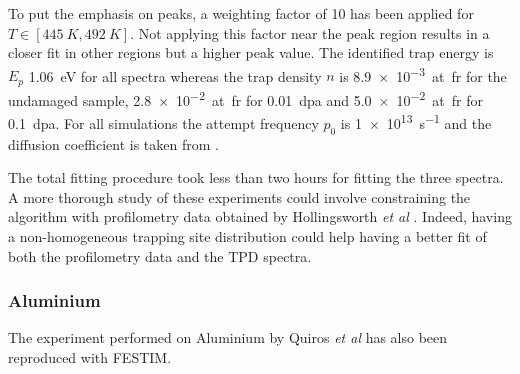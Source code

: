 To put the emphasis on peaks, a weighting factor of 10 has been applied for $T \in [\SI{445}{K}, \SI{492}{K}]$.
Not applying this factor near the peak region results in a closer fit in other regions but a higher peak value.
The identified trap energy is $E_p$ \SI{1.06}{eV} for all spectra whereas the trap density $n$ is \SI{8.9e-3}{at.fr} for the undamaged sample, \SI{2.8e-2}{at.fr} for \SI{0.01}{dpa} and \newline \SI{5.0e-2}{at.fr} for \SI{0.1}{dpa}.
For all simulations the attempt frequency $p_0$ is \SI{1e13}{s^{-1}} and the diffusion coefficient is taken from .

The total fitting procedure took less than two hours for fitting the three spectra.
A more thorough study of these experiments could involve constraining the algorithm with profilometry data obtained by Hollingsworth \textit{et al} \cite{hollingsworth_comparative_2019}.
Indeed, having a non-homogeneous trapping site distribution could help having a better fit of both the profilometry data and the TPD spectra. 

\subsubsection{Aluminium}

The experiment performed on Aluminium by Quiros \textit{et al}  has also been reproduced with FESTIM.

